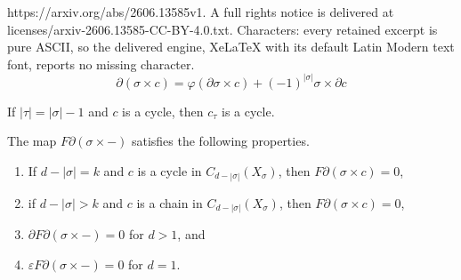 \documentclass[10pt,a4paper]{amsart}
\begin{document}
https://arxiv.org/abs/2606.13585v1. A full rights notice is delivered at licenses/arxiv-2606.13585-CC-BY-4.0.txt. Characters: every retained excerpt is pure ASCII, so the delivered engine, XeLaTeX with its default Latin Modern text font, reports no missing character.
\begin{equation}
\tag{*}
\label{leibnitzformula}
\partial(\sigma\times c)=\varphi(\partial\sigma\times c)+(-1)^{|\sigma|}\sigma\times\partial c
\end{equation}

\begin{lemma}
\label{cyclelemma}
If $|\tau|=|\sigma|-1$ and $c$ is a cycle, then $c_{\tau}$ is a cycle. 
\end{lemma}

\begin{lemma}
\label{vanishlemma}
The map 
$
F\partial(\sigma\times-)%
$
satisfies the following properties.
\begin{enumerate}[label=$\mathrm{(\roman*)}$]
\item\label{cycle} 
If $d-|\sigma|=k$ and $c$ is a cycle in $C_{d-|\sigma|}(X_{\sigma})$, then $F\partial(\sigma\times c)=0$, 
\item\label{chainvanish} 
if $d-|\sigma|>k$ and $c$ is a chain in $C_{d-|\sigma|}(X_{\sigma})$, then $F\partial(\sigma\times c)=0$, 
\item\label{chain1} 
$\partial F\partial(\sigma\times-)=0$ for $d>1$, and
\item\label{chain2}
$\varepsilon F\partial(\sigma\times-)=0$ for $d=1$. 
\end{enumerate}
\end{lemma}
\end{document}
